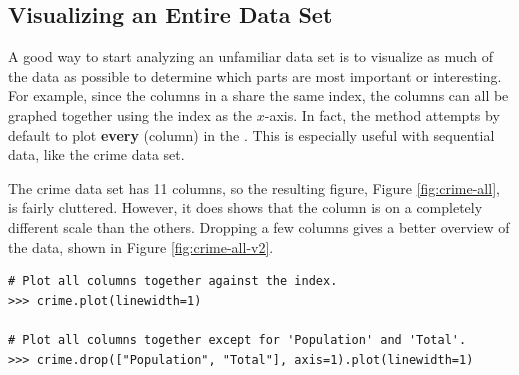 \subsection*{Visualizing an Entire Data Set} %

A good way to start analyzing an unfamiliar data set is to visualize as much of the data as possible to determine which parts are most important or interesting.
For example, since the columns in a  share the same index, the columns can all be graphed together using the index as the $x$-axis.
In fact, the  method attempts by default to plot \textbf{every}  (column) in the .
This is especially useful with sequential data, like the crime data set.

The crime data set has 11 columns, so the resulting figure, Figure \ref{fig:crime-all}, is fairly cluttered.
However, it does shows that the  column is on a completely different scale than the others.
Dropping a few columns gives a better overview of the data, shown in Figure \ref{fig:crime-all-v2}.

\begin{lstlisting}
# Plot all columns together against the index.
>>> crime.plot(linewidth=1)

# Plot all columns together except for 'Population' and 'Total'.
>>> crime.drop(["Population", "Total"], axis=1).plot(linewidth=1)
\end{lstlisting}

